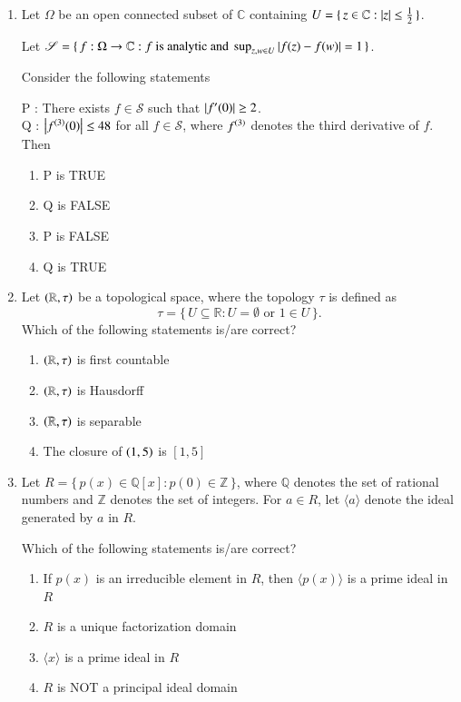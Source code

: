 \documentclass[journal,12pt,onecolumn]{IEEEtran}
\theoremstyle{remark}
\begin{document}
\begin{enumerate}[start=1, label=Q.\arabic*]
\hfill{}


\item Let $\Omega$ be an open connected subset of $\mathbb{C}$ containing $U=\{\, z\in \mathbb{C} : \left\vert z\right\vert\le \tfrac{1}{2} \,\}$.  

Let $\mathscr{S}=\{\, f : \Omega\to \mathbb{C} : f \text{ is analytic and } \sup_{z,w\in U}\left\vert f(z)-f(w)\right\vert=1 \,\}$.  

Consider the following statements\brak{:}

P : There exists $f\in \mathscr{S}$ such that $\left\vert f'(0)\right\vert\ge 2$.\\
Q : $\left\vert f^{\left(3\right)}(0)\right\vert\le 48$ for all $f\in \mathscr{S}$, where $f^{\left(3\right)}$ denotes the third derivative of $f$.\\

Then
\begin{enumerate}
\item P is TRUE
\item Q is FALSE
\item P is FALSE
\item Q is TRUE
\end{enumerate}

\hfill{}
\item Let $\left(\mathbb{R},\tau\right)$ be a topological space, where the topology $\tau$ is defined as
\[
\tau=\{\, U\subseteq \mathbb{R} : U=\emptyset \text{ or } 1\in U \,\}.
\]
Which of the following statements is/are correct?
\begin{enumerate}
\item $\left(\mathbb{R},\tau\right)$ is first countable
\item $\left(\mathbb{R},\tau\right)$ is Hausdorff
\item $\left(\mathbb{R},\tau\right)$ is separable
\item The closure of $\left(1,5\right)$ is $\left[1,5\right]$
\end{enumerate}

\hfill{}


\item Let $R=\{\, p(x)\in \mathbb{Q}[x] : p(0)\in \mathbb{Z} \,\}$, where $\mathbb{Q}$ denotes the set of rational numbers and $\mathbb{Z}$ denotes the set of integers. For $a\in R$, let $\langle a\rangle$ denote the ideal generated by $a$ in $R$.  

Which of the following statements is/are correct?
\begin{enumerate}
\item If $p(x)$ is an irreducible element in $R$, then $\langle p(x)\rangle$ is a prime ideal in $R$
\item $R$ is a unique factorization domain
\item $\langle x\rangle$ is a prime ideal in $R$
\item $R$ is NOT a principal ideal domain
\end{enumerate}


\end{enumerate}
\end{document}
